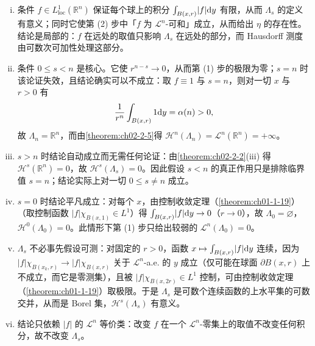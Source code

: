 \documentclass[../../main.tex]{subfiles}%
\begin{document}
\begin{remark}\label{remark:ch02-thm-2-10-条件}
\begin{enumerate}[(i)]
\item 条件 $f\in L^1_{\mathrm{loc}}(\mathbb{R}^n)$ 保证每个球上的积分 $\int_{B(x,r)}\lvert f\rvert\mathrm{d} y$ 有限，从而 $\Lambda_s$ 的定义有意义；同时它使第 (2) 步中「$f$ 为 $\mathcal{L}^n$-可和」成立，从而给出 $\eta$ 的存在性。结论是局部的：$f$ 在远处的取值只影响 $\Lambda_s$ 在远处的部分，而 Hausdorff 测度由可数次可加性处理这部分。
\item 条件 $0\leqslant s<n$ 是核心。它使 $r^{n-s}\to0$，从而第 (1) 步的极限为零；$s=n$ 时该论证失效，且结论确实可以不成立：取 $f\equiv1$ 与 $s=n$，则对一切 $x$ 与 $r>0$ 有
\begin{align*}
\frac{1}{r^n}\int_{B(x,r)}1\mathrm{d} y=\alpha(n)>0 ,
\end{align*}
故 $\Lambda_n=\mathbb{R}^n$，而由\cref{theorem:ch02-2-5}得 $\mathcal{H}^n(\Lambda_n)=\mathcal{L}^n(\mathbb{R}^n)=+\infty$。%
\item $s>n$ 时结论自动成立而无需任何论证：由\cref{theorem:ch02-2-2}(iii) 得 $\mathcal{H}^s(\mathbb{R}^n)=0$，故 $\mathcal{H}^s(\Lambda_s)=0$。因此假设 $s<n$ 的真正作用只是排除临界值 $s=n$；结论实际上对一切 $0\leqslant s\neq n$ 成立。%
\item $s=0$ 时结论平凡成立：对每个 $x$，由控制收敛定理（\cref{theorem:ch01-1-19}）（取控制函数 $\lvert f\rvert\chi_{B(x,1)}\in L^1$）得 $\int_{B(x,r)}\lvert f\rvert\mathrm{d} y\to0$（$r\to0$），故 $\Lambda_0=\varnothing$，$\mathcal{H}^0(\Lambda_0)=0$。此情形下第 (1) 步只给出较弱的 $\mathcal{L}^n(\Lambda_0)=0$。%
\item $\Lambda_s$ 不必事先假设可测：对固定的 $r>0$，函数 $x\mapsto\int_{B(x,r)}\lvert f\rvert\mathrm{d} y$ 连续，因为 $\lvert f\rvert\chi_{B(x_k,r)}\to\lvert f\rvert\chi_{B(x,r)}$ 关于 $\mathcal{L}^n$-a.e. 的 $y$ 成立（仅可能在球面 $\partial B(x,r)$ 上不成立，而它是零测集），且被 $\lvert f\rvert\chi_{B(x,2r)}\in L^1$ 控制，可由控制收敛定理（\cref{theorem:ch01-1-19}）取极限。于是 $\Lambda_s$ 是可数个连续函数的上水平集的可数交并，从而是 Borel 集，$\mathcal{H}^s(\Lambda_s)$ 有意义。%
\item 结论只依赖 $\lvert f\rvert$ 的 $\mathcal{L}^n$ 等价类：改变 $f$ 在一个 $\mathcal{L}^n$-零集上的取值不改变任何积分，故不改变 $\Lambda_s$。
\end{enumerate}
\end{remark}
\end{document}
